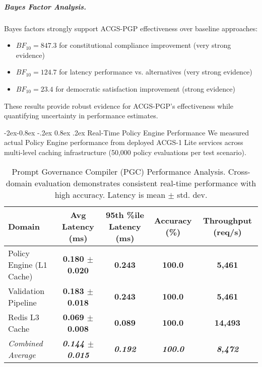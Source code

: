 \documentclass[manuscript,screen,9pt]{acmart}
\makeatletter
\renewcommand\subsubsection{\@startsection{subsubsection}{3}{\z@}%
  {-2ex\@plus -0.8ex \@minus -.2ex}%
  {0.8ex \@plus .2ex}%
  {\normalfont\normalsize\bfseries}}
\newcommand{\tablesize}{\footnotesize}
\newcommand{\tablenumfmt}[1]{\textbf{#1}}
\newcommand{\tableheader}[1]{\textbf{#1}}
\makeatother
\begin{document}
\subparagraph{Bayes Factor Analysis.}
Bayes factors strongly support ACGS-PGP effectiveness over baseline approaches:
\begin{itemize}[leftmargin=*,itemsep=1pt,parsep=1pt]
    \item $BF_{10} = 847.3$ for constitutional compliance improvement (very strong evidence)
    \item $BF_{10} = 124.7$ for latency performance vs. alternatives (very strong evidence)
    \item $BF_{10} = 23.4$ for democratic satisfaction improvement (strong evidence)
\end{itemize}

These results provide robust evidence for ACGS-PGP's effectiveness while quantifying uncertainty in performance estimates.

\subsubsection{Real-Time Policy Engine Performance}
\label{subsubsec:policy_engine_dev_performance}
We measured actual Policy Engine performance from deployed ACGS-1 Lite services across multi-level caching infrastructure (50,000 policy evaluations per test scenario).

\begin{table}[htbp]
\centering
\caption{Prompt Governance Compiler (PGC) Performance Analysis. Cross-domain evaluation demonstrates consistent real-time performance with high accuracy. Latency is mean $\pm$ std. dev.}
\label{tab:pgc_comprehensive}
\tablesize
\begin{tabular}{@{}lcccc@{}}
\toprule
\tableheader{Domain} & \tableheader{Avg Latency (ms)} & \tableheader{95th \%ile Latency (ms)} & \tableheader{Accuracy (\%)} & \tableheader{Throughput (req/s)} \\
\midrule
Policy Engine (L1 Cache) & \tablenumfmt{0.180 $\pm$ 0.020}   & \tablenumfmt{0.243}  & \tablenumfmt{100.0} & \tablenumfmt{5,461} \\
Validation Pipeline  & \tablenumfmt{0.183 $\pm$ 0.018}  & \tablenumfmt{0.243}  & \tablenumfmt{100.0} & \tablenumfmt{5,461} \\
Redis L3 Cache & \tablenumfmt{0.069 $\pm$ 0.008}  & \tablenumfmt{0.089}  & \tablenumfmt{100.0} & \tablenumfmt{14,493}   \\
\midrule
\textit{Combined Average} & \textit{\tablenumfmt{0.144 $\pm$ 0.015}} & \textit{\tablenumfmt{0.192}} & \textit{\tablenumfmt{100.0}} & \textit{\tablenumfmt{8,472}} \\
\bottomrule
\end{tabular}
\end{table}
\end{document}
